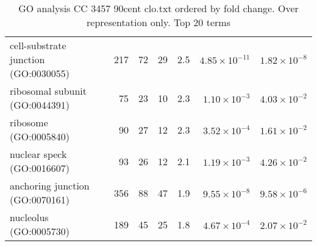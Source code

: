 \begin{table}[ht]
\begin{adjustbox}{width=\textwidth}
\begin{tabular}{lrrrrrr}
  cell-substrate junction (GO:0030055) & 217 & 72 & 29 & 2.5 & $4.85 \times 10^{-11}$ & $1.82 \times 10^{-8}$ \\ 
  ribosomal subunit (GO:0044391) & 75 & 23 & 10 & 2.3 & $1.10 \times 10^{-3}$ & $4.03 \times 10^{-2}$ \\ 
  ribosome (GO:0005840) & 90 & 27 & 12 & 2.3 & $3.52 \times 10^{-4}$ & $1.61 \times 10^{-2}$ \\ 
  nuclear speck (GO:0016607) & 93 & 26 & 12 & 2.1 & $1.19 \times 10^{-3}$ & $4.26 \times 10^{-2}$ \\ 
  anchoring junction (GO:0070161) & 356 & 88 & 47 & 1.9 & $9.55 \times 10^{-8}$ & $9.58 \times 10^{-6}$ \\ 
  nucleolus (GO:0005730) & 189 & 45 & 25 & 1.8 & $4.67 \times 10^{-4}$ & $2.07 \times 10^{-2}$ \\ 
   \hline
\end{tabular}
\end{adjustbox}
\caption{GO analysis CC 3457 90cent clo.txt ordered by fold change. Over representation only. Top 20 terms} 
\label{tab:GO analysis CC 3457 90cent clo.txt ordered by fold change. Over representation only. Top 20 terms}
\end{table}




